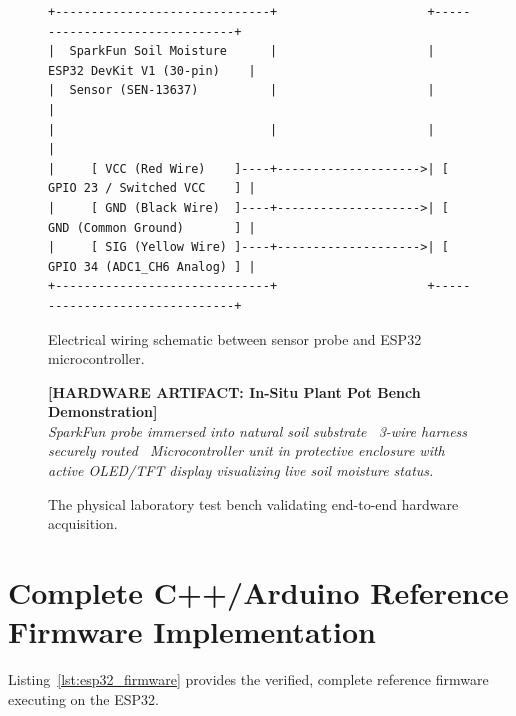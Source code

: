 \documentclass[11pt,a4paper,oneside]{report}
\begin{document}
\begin{figure}[h!]
\centering
\begin{verbatim}
+------------------------------+                     +-------------------------------+
|  SparkFun Soil Moisture      |                     |   ESP32 DevKit V1 (30-pin)    |
|  Sensor (SEN-13637)          |                     |                               |
|                              |                     |                               |
|     [ VCC (Red Wire)    ]----+-------------------->| [ GPIO 23 / Switched VCC    ] |
|     [ GND (Black Wire)  ]----+-------------------->| [ GND (Common Ground)       ] |
|     [ SIG (Yellow Wire) ]----+-------------------->| [ GPIO 34 (ADC1_CH6 Analog) ] |
+------------------------------+                     +-------------------------------+
\end{verbatim}
\caption{Electrical wiring schematic between sensor probe and ESP32 microcontroller.}
\label{fig:wiring_diagram}
\end{figure}

\begin{figure}[h!]
\centering
\begin{tcolorbox}[enhanced,colback=white,colframe=nasablue,width=0.75\linewidth,arc=2mm]
\centering
\textbf{[HARDWARE ARTIFACT: In-Situ Plant Pot Bench Demonstration]}\\[0.2cm]
\textit{SparkFun probe immersed into natural soil substrate \textbar\ 3-wire harness securely routed \textbar\ Microcontroller unit in protective enclosure with active OLED/TFT display visualizing live soil moisture status.}
\end{tcolorbox}
\caption{The physical laboratory test bench validating end-to-end hardware acquisition.}
\label{fig:bench_setup}
\end{figure}

\section{Complete C++/Arduino Reference Firmware Implementation}
Listing~\ref{lst:esp32_firmware} provides the verified, complete reference firmware executing on the ESP32.
\end{document}
